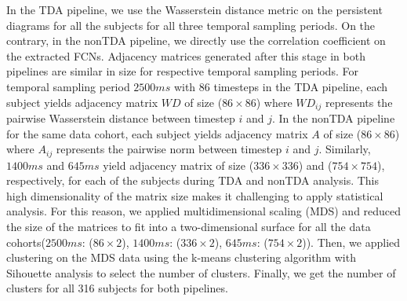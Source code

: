 In the TDA pipeline, we use the Wasserstein distance metric on the persistent diagrams for all the subjects for all three temporal sampling periods. On the contrary, in the nonTDA pipeline, we directly use the correlation coefficient on the extracted FCNs. Adjacency matrices generated after this stage in both pipelines are similar in size for respective temporal sampling periods. For temporal sampling period $2500ms$ with $86$ timesteps in the TDA pipeline, each subject yields adjacency matrix $WD$ of size ($86 \times 86$) where $WD_{ij}$ represents the pairwise Wasserstein distance between timestep $i$ and $j$. In the nonTDA pipeline for the same data cohort, each subject yields adjacency matrix $A$ of size ($86 \times 86$) where $A_{ij}$ represents the pairwise norm between timestep $i$ and $j$. Similarly, $1400ms$ and $645ms$ yield adjacency matrix of size ($336 \times 336$) and ($754 \times 754$), respectively, for each of the subjects during TDA and nonTDA analysis. This high dimensionality of the matrix size makes it challenging to apply statistical analysis. For this reason, we applied multidimensional scaling (MDS) and reduced the size of the matrices to fit into a two-dimensional surface for all the data cohorts($2500ms$: ($86 \times 2$), $1400ms$: ($336 \times 2$), $645ms$: ($754 \times 2$)). Then, we applied clustering on the MDS data using the k-means clustering algorithm with Sihouette analysis to select the number of clusters. Finally, we get the number of clusters for all 316 subjects for both pipelines. 

